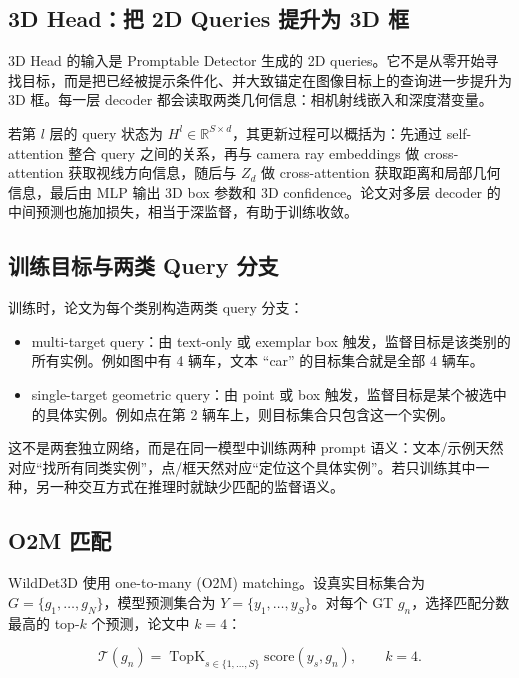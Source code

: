\subsection{3D Head：把 2D Queries 提升为 3D 框}

3D Head 的输入是 Promptable Detector 生成的 2D queries。它不是从零开始寻找目标，而是把已经被提示条件化、并大致锚定在图像目标上的查询进一步提升为 3D 框。每一层 decoder 都会读取两类几何信息：相机射线嵌入和深度潜变量。

若第 $l$ 层的 query 状态为 $H^l \in \mathbb{R}^{S \times d}$，其更新过程可以概括为：先通过 self-attention 整合 query 之间的关系，再与 camera ray embeddings 做 cross-attention 获取视线方向信息，随后与 $Z_d$ 做 cross-attention 获取距离和局部几何信息，最后由 MLP 输出 3D box 参数和 3D confidence。论文对多层 decoder 的中间预测也施加损失，相当于深监督，有助于训练收敛。

\subsection{训练目标与两类 Query 分支}

训练时，论文为每个类别构造两类 query 分支：

\begin{itemize}
    \item multi-target query：由 text-only 或 exemplar box 触发，监督目标是该类别的所有实例。例如图中有 4 辆车，文本 ``car'' 的目标集合就是全部 4 辆车。
    \item single-target geometric query：由 point 或 box 触发，监督目标是某个被选中的具体实例。例如点在第 2 辆车上，则目标集合只包含这一个实例。
\end{itemize}

这不是两套独立网络，而是在同一模型中训练两种 prompt 语义：文本/示例天然对应“找所有同类实例”，点/框天然对应“定位这个具体实例”。若只训练其中一种，另一种交互方式在推理时就缺少匹配的监督语义。

\subsection{O2M 匹配}

WildDet3D 使用 one-to-many (O2M) matching。设真实目标集合为 $G=\{g_1,\dots,g_N\}$，模型预测集合为 $Y=\{y_1,\dots,y_S\}$。对每个 GT $g_n$，选择匹配分数最高的 top-$k$ 个预测，论文中 $k=4$：

\begin{equation}
    \mathcal{T}(g_n)=\operatorname{TopK}_{s\in\{1,\dots,S\}}
    \mathrm{score}(y_s,g_n), \qquad k=4.
\end{equation}

